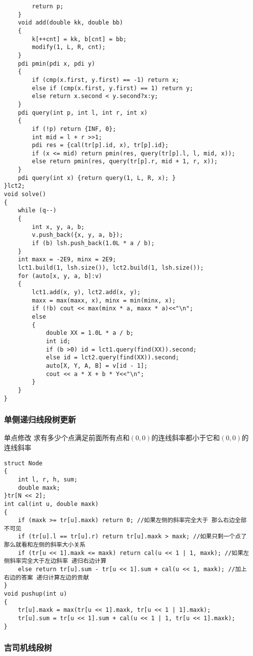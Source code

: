\documentclass[a4paper, fontset=none]{ctexart}
\begin{document}
\begin{verbatim}
        return p;
    }
    void add(double kk, double bb)
    {
        k[++cnt] = kk, b[cnt] = bb;
        modify(1, L, R, cnt);
    }
    pdi pmin(pdi x, pdi y)
    {
        if (cmp(x.first, y.first) == -1) return x;
        else if (cmp(x.first, y.first) == 1) return y;
        else return x.second < y.second?x:y;
    }
    pdi query(int p, int l, int r, int x)
    {
        if (!p) return {INF, 0};
        int mid = l + r >>1;
        pdi res = {cal(tr[p].id, x), tr[p].id};
        if (x <= mid) return pmin(res, query(tr[p].l, l, mid, x));
        else return pmin(res, query(tr[p].r, mid + 1, r, x));
    }
    pdi query(int x) {return query(1, L, R, x); }
}lct2;
void solve()
{
    while (q--)
    {
        int x, y, a, b;
        v.push_back({x, y, a, b});
        if (b) lsh.push_back(1.0L * a / b);
    }
    int maxx = -2E9, minx = 2E9;
    lct1.build(1, lsh.size()), lct2.build(1, lsh.size());
    for (auto[x, y, a, b]:v)
    {
        lct1.add(x, y), lct2.add(x, y);
        maxx = max(maxx, x), minx = min(minx, x);
        if (!b) cout << max(minx * a, maxx * a)<<"\n";
        else
        {
            double XX = 1.0L * a / b;
            int id;
            if (b >0) id = lct1.query(find(XX)).second;
            else id = lct2.query(find(XX)).second;
            auto[X, Y, A, B] = v[id - 1];
            cout << a * X + b * Y<<"\n";
        }
    }
}
\end{verbatim}
\subsubsection{单侧递归线段树更新}
单点修改 \quad 求有多少个点满足前面所有点和$(0, 0)$的连线斜率都小于它和$(0, 0)$的连线斜率

\begin{verbatim}
struct Node
{
    int l, r, h, sum;
    double maxk;
}tr[N << 2];
int cal(int u, double maxk)
{
    if (maxk >= tr[u].maxk) return 0; //如果左侧的斜率完全大于 那么右边全部不可见
    if (tr[u].l == tr[u].r) return tr[u].maxk > maxk; //如果只剩一个点了 那么就看和左侧的斜率大小关系
    if (tr[u << 1].maxk <= maxk) return cal(u << 1 | 1, maxk); //如果左侧斜率完全大于左边斜率 递归右边计算
    else return tr[u].sum - tr[u << 1].sum + cal(u << 1, maxk); //加上右边的答案 递归计算左边的贡献
}
void pushup(int u)
{
    tr[u].maxk = max(tr[u << 1].maxk, tr[u << 1 | 1].maxk);
    tr[u].sum = tr[u << 1].sum + cal(u << 1 | 1, tr[u << 1].maxk);
}
\end{verbatim}
\subsubsection{吉司机线段树}
\end{document}
